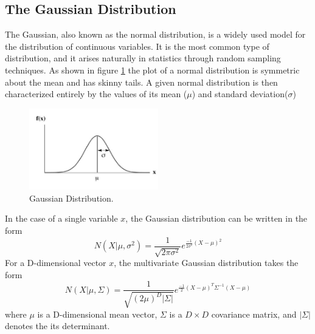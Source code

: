 \documentclass[12pt, a4paper, twoside]{report}
\begin{document}
\subsection{The Gaussian Distribution}
The Gaussian, also known as the normal distribution, is a widely used model for the distribution of continuous variables. It is the most common type of distribution, and it arises naturally in statistics through random sampling techniques. As shown in figure \ref{fig:gmm-normal-dist} the plot of a normal distribution is symmetric about the mean and has skinny tails. A given normal distribution is then characterized entirely by the values of its mean ($\mu$) and standard deviation($\sigma$)
\begin{figure}[!h]
	\centering
	\includegraphics[width=0.5\textwidth]
	{images/chapter4/gmm-normal-dist}
	\caption{Gaussian Distribution.}
	\label{fig:gmm-normal-dist}
\end{figure}

In the case of a single variable $x$, the Gaussian distribution can be written in the form
\begin{equation}
N(X|\mu,\sigma^2) = \frac{1}{\sqrt{2\pi\sigma^2}}e^{\frac{-1}{2\sigma^2}(X-\mu)^2}
\end{equation}
For a D-dimensional vector $x$, the multivariate Gaussian distribution takes the form
\begin{equation}
N(X|\mu,\Sigma) = \frac{1}{\sqrt{(2\mu)^{D}|\Sigma|}}e^{\frac{-1}{2}(X-\mu)^T \Sigma^{-1}(X-\mu)}
\end{equation}
where $\mu$ is a D-dimensional mean vector, $\Sigma$ is a $D \times D$ covariance matrix, and $|\Sigma|$ denotes the its determinant.
\end{document}
